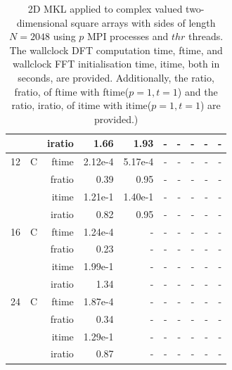 \documentclass[a4paper]{article}
\begin{document}
\begin{table}[htbp]
\begin{center}
\begin{small}
\begin{tabular}{|r|r|r|r|r|r|r|r|r|r|}
             &             &  iratio &    1.66  &    1.93  &      - &      - &      - &      - &      - \\\hline
   12 &   C &  ftime &    2.12e-4 &    5.17e-4 &      - &      - &      - &      - &      - \\
             &             &  fratio &    0.39 &    0.95 &      - &      - &      - &      - &      - \\
             &             &  itime &    1.21e-1 &    1.40e-1 &      - &      - &      - &      - &      - \\
             &             &  iratio &   0.82 &    0.95 &      - &      - &      - &      - &      - \\\hline
   16 &   C &  ftime &    1.24e-4 &      - &      - &      - &      - &      - &      - \\
             &             &  fratio &    0.23 &      - &      - &      - &      - &      - &      - \\
             &             &  itime &    1.99e-1 &      - &      - &      - &      - &      - &      - \\
             &             &  iratio &    1.34  &      - &      - &      - &      - &      - &      - \\\hline
   24 &   C &  ftime &    1.87e-4 &      - &      - &      - &      - &      - &      - \\
             &             &  fratio &    0.34 &      - &      - &      - &      - &      - &      - \\
             &             &  itime &    1.29e-1 &      - &      - &      - &      - &      - &      - \\
             &             &  iratio &    0.87 &      - &      - &      - &      - &      - &      - \\\hline
\end{tabular}
\caption{2D MKL applied to complex valued two-dimensional square arrays with sides of length $N=2048$ using $p$ MPI processes and $thr$ threads. The wallclock DFT computation time, ftime, and wallclock FFT initialisation time, itime, both in seconds, are provided. Additionally, the ratio, fratio, of ftime  with ftime($p=1,t=1$) and the ratio, iratio, of itime  with itime($p=1,t=1$) are provided.) }\label{Tbl:MKL2d2048c}
\end{small}
\end{center}
\end{table}
\end{document}
